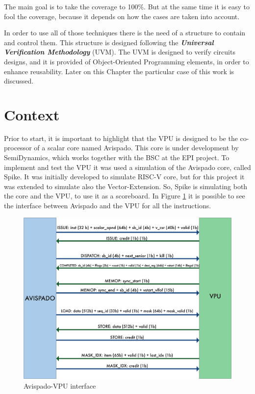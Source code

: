 The main goal is to take the coverage to 100\%. But at the same time it is easy to fool the coverage, because it depends on how the cases are taken into account.

In order to use all of those techniques there is the need of a structure to contain and control them.
This structure is designed following the \textbf{\emph{Universal Verification Methodology}} (UVM). The UVM is designed to verify circuits designs, and it is provided of Object-Oriented Programming elements, in order to enhance reusability. Later on this Chapter the particular case of this work is discussed.

\section{Context}
Prior to start, it is important to highlight that the VPU is designed to be the co-processor of a scalar core named Avispado. This core is under development by SemiDynamics, which works together with the BSC at the EPI project. To implement and test the VPU it was used a simulation of the Avispado core, called Spike. It was initially developed to simulate RISC-V core, but for this project it was extended to simulate also the Vector-Extension. So, Spike is simulating both the core and the VPU, to use it as a scoreboard.
In Figure \ref{avi-vpu} it is possible to see the interface between Avispado and the VPU for all the instructions.

\begin{figure}[H]
    \centering
    \includegraphics[scale = 0.6]{Chapter_1/img/avi-vpu.png}
    \caption{Avispado-VPU interface}
    \label{avi-vpu}
\end{figure}


